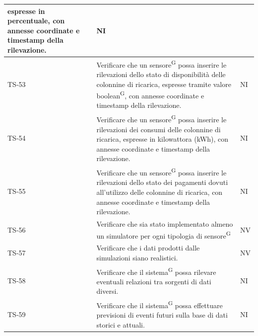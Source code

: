 \documentclass[8pt]{article}
\newcommand{\glossterm}[1]{#1\textsuperscript{G}} %
\begin{document}
\begin{longtable}{|>{\centering}p{2cm}|>{\RaggedRight}m{12cm}|>{\centering\arraybackslash}p{2cm}|}
    espresse in percentuale, con annesse coordinate e timestamp della rilevazione. & NI \\
    \hline
    TS-53 & Verificare che un \glossterm{sensore} possa inserire le rilevazioni dello stato di disponibilità delle colonnine di ricarica,
    espresse tramite valore \glossterm{boolean}, con annesse coordinate e timestamp della rilevazione. & NI \\
    \hline
    TS-54 & Verificare che un \glossterm{sensore} possa inserire le rilevazioni dei consumi delle colonnine di ricarica,
    espresse in kilowattora (kWh), con annesse coordinate e timestamp della rilevazione. & NI \\
    \hline
    TS-55 & Verificare che un \glossterm{sensore} possa inserire le rilevazioni dello stato dei pagamenti dovuti all'utilizzo delle colonnine di ricarica, con annesse coordinate e timestamp della rilevazione. & NI \\
    \hline
    TS-56 & Verificare che sia stato implementato almeno un simulatore per ogni tipologia di \glossterm{sensore}
    & NV \\
    \hline
    TS-57 & Verificare che i dati prodotti dalle simulazioni siano realistici. & NV \\
    \hline
    TS-58 & Verificare che il \glossterm{sistema} possa rilevare eventuali relazioni tra sorgenti di dati
    diversi. & NI \\
    \hline
    TS-59 & Verificare che il \glossterm{sistema} possa effettuare previsioni di eventi futuri sulla base di dati storici e attuali. & NI \\
    \hline
\end{longtable}
\clearpage
\end{document}
